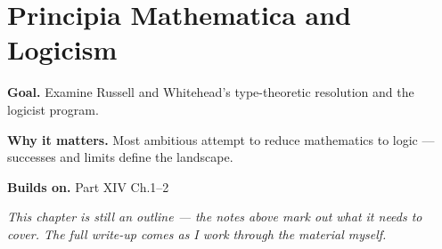 \chapter{Principia Mathematica and Logicism}
\label{ch:14-metamathematics-03}

\begin{chapterintro}
\textbf{Goal.} Examine Russell and Whitehead's type-theoretic resolution and the logicist program.

\textbf{Why it matters.} Most ambitious attempt to reduce mathematics to logic — successes and limits define the landscape.

\textbf{Builds on.} Part XIV Ch.1–2
\end{chapterintro}

\textit{This chapter is still an outline --- the notes above mark out what it needs to cover. The full write-up comes as I work through the material myself.}
